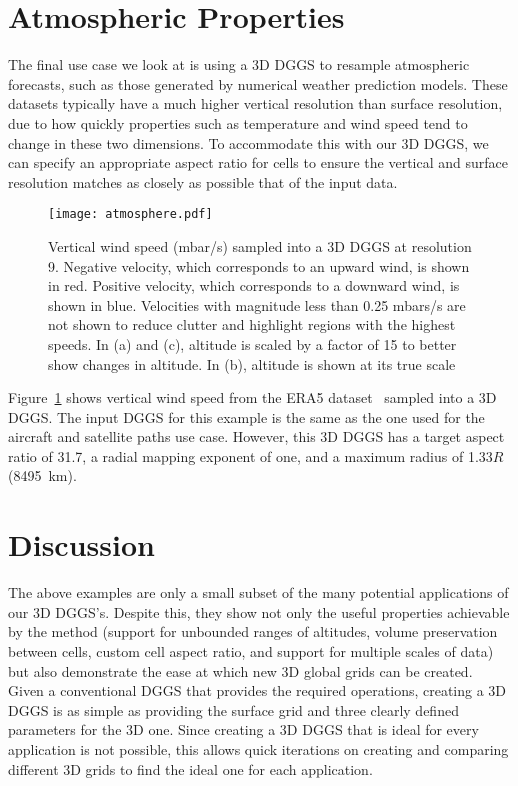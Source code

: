 \section{Atmospheric Properties}
The final use case we look at is using a 3D DGGS to resample atmospheric forecasts, such as those generated by numerical weather prediction models.
These datasets typically have a much higher vertical resolution than surface resolution, due to how quickly properties such as temperature and wind speed tend to change in these two dimensions.
To accommodate this with our 3D DGGS, we can specify an appropriate aspect ratio for cells to ensure the vertical and surface resolution matches as closely as possible that of the input data.


\begin{figure}[h]
	\centering
	\texttt{[image: atmosphere.pdf]}
	\caption[Atmospheric properties resampling use case showing vertical wind speed]{
		Vertical wind speed (mbar/s) sampled into a 3D DGGS at resolution 9.
		Negative velocity, which corresponds to an upward wind, is shown in red.
		Positive velocity, which corresponds to a downward wind, is shown in blue.
		Velocities with magnitude less than 0.25 mbars/s are not shown to reduce clutter and highlight regions with the highest speeds.
		In (a) and (c), altitude is scaled by a factor of 15 to better show changes in altitude.
		In (b), altitude is shown at its true scale
	}
	\label{fig:atmosphere}
\end{figure}


Figure~\ref{fig:atmosphere} shows vertical wind speed from the ERA5 dataset~\cite{era5} sampled into a 3D DGGS.
The input DGGS for this example is the same as the one used for the aircraft and satellite paths use case.
However, this 3D DGGS has a target aspect ratio of 31.7, a radial mapping exponent of one, and a maximum radius of 1.33$R$ (8495~km).


\section{Discussion}
The above examples are only a small subset of the many potential applications of our 3D DGGS's.
Despite this, they show not only the useful properties achievable by the method (support for unbounded ranges of altitudes, volume preservation between cells, custom cell aspect ratio, and support for multiple scales of data) but also demonstrate the ease at which new 3D global grids can be created.
Given a conventional DGGS that provides the required operations, creating a 3D DGGS is as simple as providing the surface grid and three clearly defined parameters for the 3D one.
Since creating a 3D DGGS that is ideal for every application is not possible, this allows quick iterations on creating and comparing different 3D grids to find the ideal one for each application.